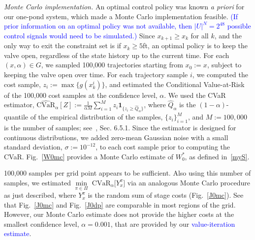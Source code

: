 \documentclass[letterpaper, 10 pt, conference]{ieeeconf}  %
\begin{document}
\textit{Monte Carlo implementation.}
An optimal control policy was known \textit{a priori} for our one-pond system, which made a Monte Carlo implementation feasible.
\textcolor{blue}{(If prior information on an optimal policy was not available, then $|U|^N = 2^{48}$ possible control signals would need to be simulated.)} 
Since $x_{k+1}\geq x_k$ for all $k$, and the only way to exit the constraint set is if $x_k \geq 5$ft,
an optimal policy is to keep the valve open, regardless of the state history up to the current time.
For each $(x,\alpha) \in G$, we sampled 100,000 trajectories starting from $x_0 := x$, subject to keeping the valve open over time.
For each trajectory sample $i$, we computed the cost sample, $z_i := \max\{g(x_k^i)\}$, and estimated the Conditional Value-at-Risk
of the 100,000 cost samples at the confidence level, $\alpha$. 
We used the CVaR estimator, $\widehat{\text{CVaR}}_\alpha[Z] := \frac{1}{\alpha M}\sum_{i=1}^M z_i \textbf{1}_{\{z_i\geq \hat{Q}_\alpha\}}$,
where $\hat{Q}_\alpha$ is the $(1-\alpha)$-quantile of the empirical distribution of the samples, $\{z_i\}_{i=1}^M$,
and $M := 100,000$ is the number of samples; see~\cite{shapiro2009lectures}, Sec. 6.5.1.
Since the estimator is designed for continuous distributions, %
we added zero-mean Gaussian noise with a small standard deviation, $\sigma := 10^{-12}$, to each cost sample prior to computing the CVaR.
Fig.~\ref{W0mc} provides a Monte Carlo estimate of $W_0^*$, as defined in~\eqref{myS}.

100,000 samples per grid point appears to be sufficient. 
Also using this number of samples, we estimated ${\underset{\pi \in \Pi}\min}\text{ CVaR}_\alpha \big[ Y_x^{\pi} \big]$ via an analogous Monte Carlo
procedure as just described, where $Y_x^\pi$ is the random sum of stage costs (Fig.~\ref{J0mc}).\footnotemark
{}
See that Fig.~\ref{J0mc} and Fig.~\ref{J0dp} are comparable in most regions of the grid. 
However, our Monte Carlo estimate does not provide the higher costs at the smallest confidence level, $\alpha = 0.001$,
that are provided by our \textcolor{blue}{value-iteration estimate}.   
\end{document}
